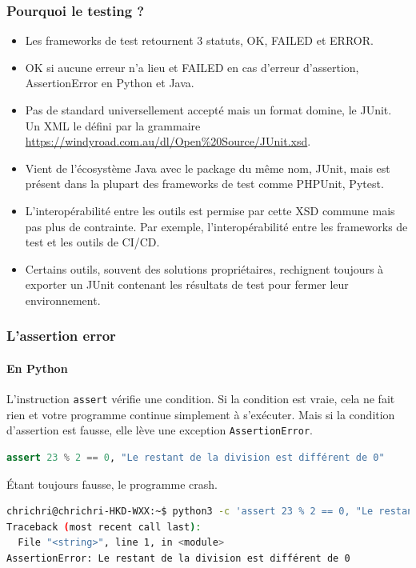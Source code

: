 \documentclass{beamer}
\begin{document}
    \begin{frame}
        \transdissolve
        \frametitle{Pourquoi le testing ?}
        \begin{itemize}
            \item Les frameworks de test retournent 3 statuts, OK, FAILED et ERROR.

            \item OK si aucune erreur n’a lieu et FAILED en cas d’erreur d’assertion, AssertionError en Python et Java.

            \item Pas de standard universellement accepté mais un format domine, le JUnit. Un XML le défini par la grammaire \url{https://windyroad.com.au/dl/Open\%20Source/JUnit.xsd}.

            \item Vient de l’écosystème Java avec le package du même nom, JUnit, mais est présent dans la plupart des frameworks de test comme PHPUnit, Pytest.

            \item L’interopérabilité entre les outils est permise par cette XSD commune mais pas plus de contrainte. Par exemple, l’interopérabilité entre les frameworks de test et les outils de CI/CD.

            \item Certains outils, souvent des solutions propriétaires, rechignent toujours à exporter un JUnit contenant les résultats de test pour fermer leur environnement.

        \end{itemize}
    \end{frame}

    \begin{frame}[fragile]
        \frametitle{L'assertion error}
        \framesubtitle{En Python}
        \transdissolve
        L’instruction \lstinline{assert} vérifie une condition.
        Si la condition est vraie, cela ne fait rien et votre programme continue simplement à s’exécuter. Mais si la condition d’assertion est fausse, elle lève une exception \lstinline{AssertionError}.
        \begin{lstlisting}[language=Python]
assert 23 % 2 == 0, "Le restant de la division est différent de 0"
        \end{lstlisting}
        Étant toujours fausse, le programme crash.
        \begin{lstlisting}[language=sh]
chrichri@chrichri-HKD-WXX:~$ python3 -c 'assert 23 % 2 == 0, "Le restant de la division est différent de 0"'
Traceback (most recent call last):
  File "<string>", line 1, in <module>
AssertionError: Le restant de la division est différent de 0
        \end{lstlisting}
    \end{frame}
\end{document}
